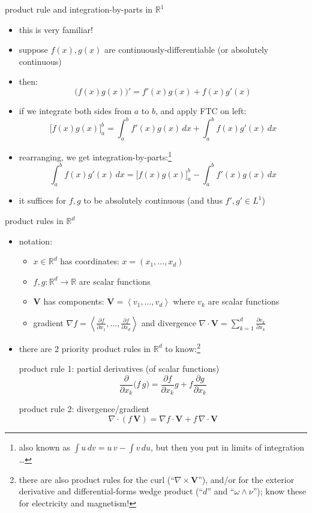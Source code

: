 \documentclass[10pt,
               svgnames,
               hyperref={colorlinks,
                         citecolor=DeepPink4,
                         linkcolor=FireBrick,
                         urlcolor=blue},
               usepdftitle=false]{beamer}
\newcommand{\bV}{\mathbf{V}}
\newcommand{\RR}{\mathbb{R}}
\newcommand{\Div}{\nabla\cdot}
\newcommand{\grad}{\nabla}
\begin{document}
\begin{frame}{product rule and integration-by-parts in $\RR^1$}

\begin{itemize}
\item this is very familiar!
\item suppose $f(x),g(x)$ are continuously-differentiable {\small (or absolutely continuous)}
\item then:
	$$\Big(f(x) g(x)\Big)' = f'(x) g(x) + f(x) g'(x)$$
\item if we integrate both sides from $a$ to $b$, and apply FTC on left:
	$$\Big[f(x) g(x)\Big]_a^b = \int_a^b f'(x) g(x)\,dx + \int_a^b f(x) g'(x)\,dx$$
\item rearranging, we get integration-by-parts:\footnote{also known as $\int u\,dv = u\,v - \int v\,du$, but then you put in limits of integration \dots}
	$$\boxed{\int_a^b f(x) g'(x)\,dx = \Big[f(x) g(x)\Big]_a^b - \int_a^b f'(x) g(x)\,dx}$$
\item it suffices for $f,g$ to be absolutely continuous (and thus $f',g'\in L^1$)
\end{itemize}
\end{frame}


\begin{frame}{product rules in $\RR^d$}

\begin{itemize}
\item notation:
    \begin{itemize}
    \item[$\circ$] $x\in\RR^d$ has coordinates: \quad $x = (x_1,\dots,x_d)$
    \item[$\circ$] $f,g:\RR^d\to\RR$ are scalar functions
    \item[$\circ$] $\bV$ has components: \quad $\bV = \left<v_1,\dots,v_d\right>$ \quad where $v_k$ are scalar functions
    \item[$\circ$] gradient $\grad f = \left<\frac{\partial f}{\partial x_1}, \dots,\frac{\partial f}{\partial x_d}\right>$ and divergence $\Div \bV = \sum_{k=1}^d \frac{\partial v_k}{\partial x_k}$
    \end{itemize}
\item there are \alert{2 priority product rules} in $\RR^d$ to know:\footnote{there are also product rules for the curl (``$\nabla\times\bV$''), and/or for the exterior derivative and differential-forms wedge product (``$d$'' and ``$\omega\wedge\nu$''); know these for electricity and magnetism!}

\begin{block}{product rule 1: partial derivatives (of scalar functions)}
    $$\frac{\partial}{\partial x_k} \Big(f \,g\Big) = \frac{\partial f}{\partial x_k} g + f \frac{\partial g}{\partial x_k}$$
\end{block}

\begin{block}{product rule 2: divergence/gradient}
    $$\Div (f\,\bV) = \grad f\cdot \bV + f\,\Div \bV$$
\end{block}
\end{itemize}
\end{frame}
\end{document}
